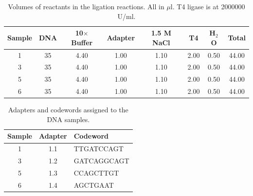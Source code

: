 \documentclass[a4paper,12pt]{article}
\begin{document}
\begin{table}
\caption{Volumes of reactants in the ligation reactions. All in $\mu$l. T4 ligase is at 2000000 U/ml.}\label{tau:ligation}
\vspace*{0.2cm}
\begin{tabular}{cccccccc}
\toprule
Sample&DNA&10$\times$ Buffer&Adapter&1.5 M NaCl&T4&H$_2$O&Total\\
\midrule
1&35&4.40&1.00&1.10&2.00&0.50&44.00\\
3&35&4.40&1.00&1.10&2.00&0.50&44.00\\
5&35&4.40&1.00&1.10&2.00&0.50&44.00\\
6&35&4.40&1.00&1.10&2.00&0.50&44.00\\
\bottomrule
\end{tabular}
\end{table}

\begin{table}
\begin{center}
\caption{Adapters and codewords assigned to the DNA samples.}\label{tau:codewords}
\vspace*{0.2cm}
\begin{tabular}{ccl}
\toprule
Sample&Adapter&Codeword\\
\midrule
1&1.1&TTGATCCAGT\\
3&1.2&GATCAGGCAGT\\
5&1.3&CCAGCTTGT\\
6&1.4&AGCTGAAT\\
\bottomrule
\end{tabular}
\end{center}
\end{table}
\end{document}
